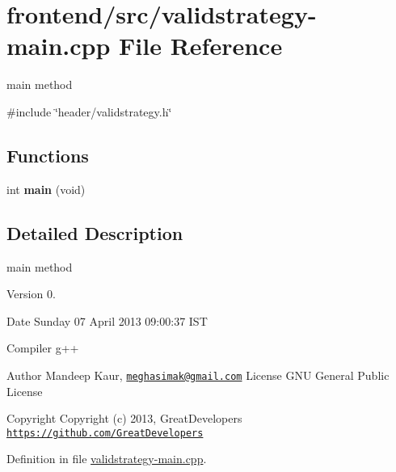 \hypertarget{validstrategy-main_8cpp}{\section{frontend/src/validstrategy-\/main.cpp \-File \-Reference}
\label{d9/dce/validstrategy-main_8cpp}
}


main method  


{\ttfamily \#include \char`\"{}header/validstrategy.\-h\char`\"{}}\*
\subsection*{\-Functions}
\begin{DoxyCompactItemize}
\item 
\hypertarget{validstrategy-main_8cpp_a840291bc02cba5474a4cb46a9b9566fe}{int {\bfseries main} (void)}\label{d9/dce/validstrategy-main_8cpp_a840291bc02cba5474a4cb46a9b9566fe}

\end{DoxyCompactItemize}


\subsection{\-Detailed \-Description}
main method \begin{DoxyVersion}{\-Version}
0. 
\end{DoxyVersion}
\begin{DoxyDate}{\-Date}
\-Sunday 07 \-April 2013 09\-:00\-:37 \-I\-S\-T\par
 \-Compiler g++
\end{DoxyDate}
\begin{DoxyAuthor}{\-Author}
\-Mandeep \-Kaur, \href{mailto:meghasimak@gmail.com}{\tt meghasimak@gmail.\-com} \-License \-G\-N\-U \-General \-Public \-License 
\end{DoxyAuthor}
\begin{DoxyCopyright}{\-Copyright}
\-Copyright (c) 2013, \-Great\-Developers \href{https://github.com/GreatDevelopers}{\tt https\-://github.\-com/\-Great\-Developers} 
\end{DoxyCopyright}


\-Definition in file \hyperlink{validstrategy-main_8cpp_source}{validstrategy-\/main.\-cpp}.

